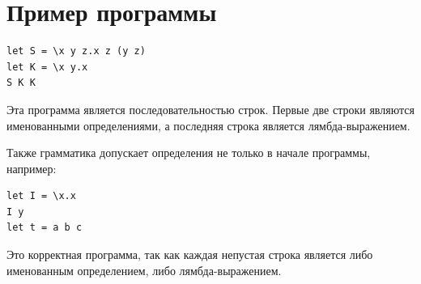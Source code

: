 \documentclass[12pt,a4paper]{article}
\begin{document}
\section*{Пример программы}

\begin{verbatim}
let S = \x y z.x z (y z)
let K = \x y.x
S K K
\end{verbatim}

Эта программа является последовательностью строк. Первые две строки
являются именованными определениями, а последняя строка является
лямбда-выражением.

Также грамматика допускает определения не только в начале программы,
например:

\begin{verbatim}
let I = \x.x
I y
let t = a b c
\end{verbatim}

Это корректная программа, так как каждая непустая строка является либо
именованным определением, либо лямбда-выражением.
\end{document}
